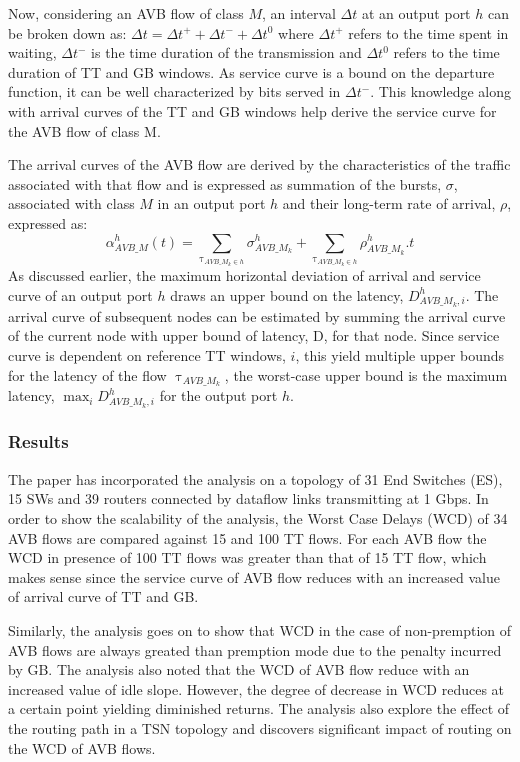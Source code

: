\documentclass[journal,12pt,twocolumn]{IEEEtran}
\begin{document}
Now, considering an AVB flow of class $M$, an interval $\Delta t$ at an output port $h$ can be broken down as: $\Delta t =\Delta t^+ + \Delta t^- + \Delta t^0$ where $\Delta t^+$ refers to the time spent in waiting, $\Delta t^-$ is the time duration of the transmission and $\Delta t^0$ refers to the time duration of TT and GB windows. As service curve is a bound on the departure function, it can be well characterized by bits served in $\Delta t^-$. This knowledge along with arrival curves of the TT and GB windows help derive the service curve for the AVB flow of class M.

The arrival curves of the AVB flow are derived by the characteristics of the traffic associated with that flow  and is expressed as summation of the bursts, $\sigma$, associated with class $M$ in an output port $h$ and their long-term rate of arrival, $\rho$, expressed as: 
\begin{equation}
\label{avbalpha}
\alpha^h_{AVB\_M}(t)=\sum_{\uptau_{AVB\_M_k\in h}}\sigma_{AVB\_M_k}^h+ \sum_{\uptau_{AVB\_M_k\in h}} \rho_{AVB\_M_k}^h.t
\end{equation}
As discussed earlier, the maximum horizontal deviation of arrival and service curve of an output port $h$ draws an upper bound on the latency, $D_{AVB\_M_k,i}^h$. The arrival curve of subsequent nodes can be estimated by summing the arrival curve of the current node with upper bound of latency, D, for that node. Since service curve is dependent on reference TT windows, $i$, this yield multiple upper bounds for the latency of the flow $\uptau_{AVB\_M_k}$, the worst-case upper bound is the maximum latency, $ \max_{i} D_{AVB\_M_k,i}^h$ for the output port $h$.
\subsubsection{Results}
The paper has incorporated the analysis on a topology of 31 End Switches (ES), 15 SWs and 39 routers connected by dataflow links transmitting at 1 Gbps. In order to show the scalability of the analysis, the Worst Case Delays (WCD) of 34 AVB flows are compared against 15 and 100 TT flows. For each AVB flow the WCD in presence of 100 TT flows was greater than that of 15 TT flow, which makes sense since the service curve of AVB flow reduces with an increased value of arrival curve of TT and GB.

Similarly, the analysis goes on to show that WCD in the case of non-premption of AVB flows are always greated than premption mode due to the penalty incurred by GB. The analysis also noted that the WCD of AVB flow reduce with an increased value of idle slope. However, the degree of decrease in WCD reduces at a certain point yielding diminished returns. The analysis also explore the effect of the routing path in a TSN topology and discovers significant impact of routing on the WCD of AVB flows.
\end{document}
